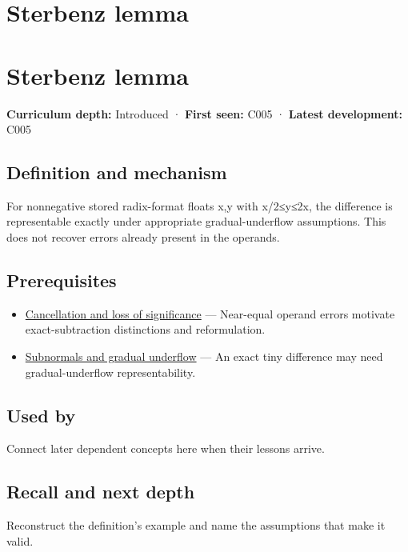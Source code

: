 \hypertarget{appendix-399b7ad53f39}{}
\section*{Sterbenz lemma}
\section{Sterbenz lemma}\label{sterbenz-lemma}

\textbf{Curriculum depth:} Introduced · \textbf{First seen:} C005 · \textbf{Latest development:} C005

\subsection{Definition and mechanism}\label{definition-and-mechanism}

For nonnegative stored radix-format floats x,y with x/2≤y≤2x, the difference is representable exactly under appropriate gradual-underflow assumptions. This does not recover errors already present in the operands.

\subsection{Prerequisites}\label{prerequisites}

\begin{itemize}
\tightlist
\item
  \hyperref[appendix-a2773a6a2f9d]{Cancellation and loss of significance} --- Near-equal operand errors motivate exact-subtraction distinctions and reformulation.
\item
  \hyperref[appendix-00a6e044c437]{Subnormals and gradual underflow} --- An exact tiny difference may need gradual-underflow representability.
\end{itemize}

\subsection{Used by}\label{used-by}

Connect later dependent concepts here when their lessons arrive.

\subsection{Recall and next depth}\label{recall-and-next-depth}

Reconstruct the definition's example and name the assumptions that make it valid.

